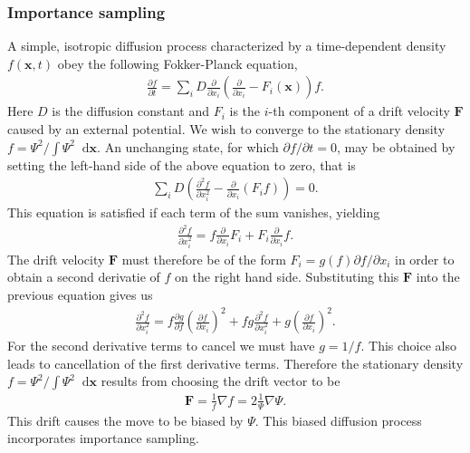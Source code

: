\documentclass[twoside,english]{uiofysmaster}
\newcommand*\dif{\mathop{}\!\mathrm{d}}
\begin{document}
\subsubsection{Importance sampling}
A simple, isotropic diffusion process characterized by a
time-dependent density $f(\bm{x}, t)$ obey the following Fokker-Planck
equation,
\begin{align}
	\frac{\partial f}{\partial t} = \sum_i D \frac{\partial}{\partial x_i} ( \frac{\partial}{\partial x_i} - F_i(\bm{x}) ) f .
\end{align}
Here $D$ is the diffusion constant and $F_i$ is the $i$-th component
of a drift velocity $\bm{F}$ caused by an external potential. We wish
to converge to the stationary density $f = \Psi^2 / \int \Psi^2 \dif
\bm{x}$. An unchanging state, for which $\partial f / \partial t = 0$,
may be obtained by setting the left-hand side of the above equation to
zero, that is
\begin{align}
	\sum_i D(\frac{\partial^2 f}{\partial x_i^2} - \frac{\partial}{\partial x_i} (F_i f)  ) = 0.
\end{align}
This equation is satisfied if each term of the sum vanishes, yielding
\begin{align}
	\frac{\partial^2 f}{\partial x_i^2} = f \frac{\partial}{\partial x_i} F_i + F_i \frac{\partial}{\partial x_i} f.
\end{align}
The drift velocity $\bm{F}$ must therefore be of the form $F_i = g(f)
\partial f/ \partial x_i$ in order to obtain a second derivatie of $f$
on the right hand side. Substituting this $\bm{F}$ into the previous
equation gives us
\begin{align}
	\frac{\partial^2 f}{\partial x_i^2} = f \frac{\partial g}{\partial f} (\frac{\partial f}{\partial x_i})^2
	+ f g \frac{\partial^2 f}{\partial x_i^2} + g (\frac{\partial f}{\partial x_i})^2.
\end{align}
For the second derivative terms to cancel we must have $g = 1/f$. This
choice also leads to cancellation of the first derivative
terms. Therefore the stationary density $f = \Psi^2 / \int \Psi^2 \dif
\bm{x}$ results from choosing the drift vector to be
\begin{align}
	\bm{F} = \frac{1}{f} \nabla f = 2 \frac{1}{\Psi} \nabla \Psi.
\end{align}
This drift causes the move to be biased by $\Psi$. This biased diffusion process incorporates importance sampling.
\end{document}
